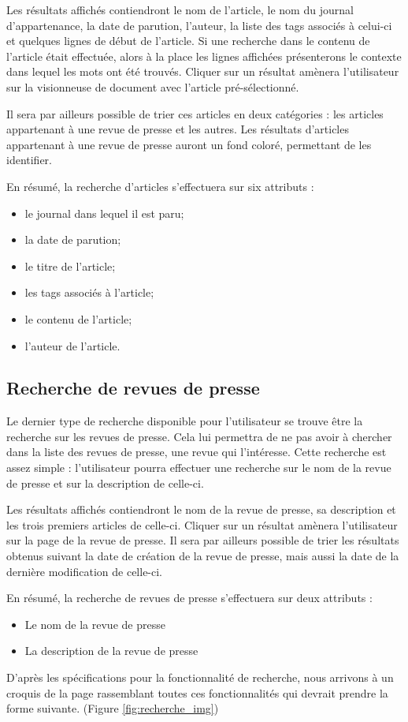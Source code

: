 Les résultats affichés contiendront le nom de l'article, le nom du journal d'appartenance, la date de parution, l'auteur, la liste des tags associés à celui-ci et quelques lignes de début de l'article. Si une recherche dans le contenu de l'article était effectuée, alors à la place les lignes affichées présenterons le contexte dans lequel les mots ont été trouvés. Cliquer sur un résultat amènera l'utilisateur sur la visionneuse de document avec l'article pré-sélectionné.

Il sera par ailleurs possible de trier ces articles en deux catégories : les articles appartenant à une revue de presse et les autres. Les résultats d'articles appartenant à une revue de presse auront un fond coloré, permettant de les identifier.

En résumé, la recherche d'articles s'effectuera sur six attributs :
\begin{itemize}
	\item le journal dans lequel il est paru;
	\item la date de parution;
	\item le titre de l'article;
	\item les tags associés à l'article;
	\item le contenu de l'article;
	\item l'auteur de l'article.
\end{itemize}

\subsection{Recherche de revues de presse}
\label{sec:recherche_revue}

Le dernier type de recherche disponible pour l'utilisateur se trouve être la recherche sur les revues de presse. Cela lui permettra de ne pas avoir à chercher dans la liste des revues de presse, une revue qui l'intéresse. Cette recherche est assez simple : l'utilisateur pourra effectuer une recherche sur le nom de la revue de presse et sur la description de celle-ci.

Les résultats affichés contiendront le nom de la revue de presse, sa description et les trois premiers articles de celle-ci. Cliquer sur un résultat amènera l'utilisateur sur la page de la revue de presse. Il sera par ailleurs possible de trier les résultats obtenus suivant la date de création de la revue de presse, mais aussi la date de la dernière modification de celle-ci.

En résumé, la recherche de revues de presse s'effectuera sur deux attributs :
\begin{itemize}
	\item Le nom de la revue de presse
	\item La description de la revue de presse
\end{itemize}
\bigskip
\par
D'après les spécifications pour la fonctionnalité de recherche, nous arrivons à un croquis de la page rassemblant toutes ces fonctionnalités qui devrait prendre la forme suivante. (Figure \ref{fig:recherche_img})

